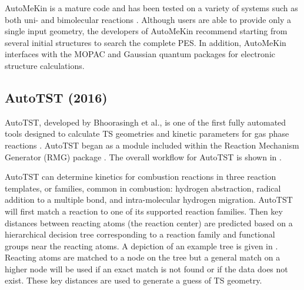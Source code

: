 \documentclass[preprint, 11pt]{elsarticle} %
\begin{document}
AutoMeKin is a mature code and has been tested on a variety of systems such as both uni- and bimolecular reactions \cite{Martinez:2015,Martinez:2015jccp,rodriguez:2018,Kopec:2019}.
Although users are able to provide only a single input geometry, the developers of AutoMeKin recommend starting from several initial structures to search the complete PES.
In addition, AutoMeKin interfaces with the MOPAC \cite{mopac:2016} and Gaussian \cite{Gaussian:2009} quantum packages for electronic structure calculations.

\subsection{AutoTST (2016)}

AutoTST, developed by Bhoorasingh et al., is one of the first fully automated tools designed to calculate TS geometries and kinetic parameters for gas phase reactions \cite{Bhoorasingh:2015,bhoorasingh:2017}.
AutoTST began as a module included within the Reaction Mechanism Generator (RMG) package \cite{gao:2016}. 
The overall workflow for AutoTST is shown in .

AutoTST can determine kinetics for combustion reactions in three reaction templates, or families, common in combustion: hydrogen abstraction, radical addition to a multiple bond, and intra-molecular hydrogen migration.
AutoTST will first match a reaction to one of its supported reaction families.
Then key distances between reacting atoms (the reaction center) are predicted based on a hierarchical decision tree corresponding to a reaction family and functional groups near the reacting atoms. 
A depiction of an example tree is given in .
Reacting atoms are matched to a node on the tree but a general match on a higher node will be used if an exact match is not found or if the data does not exist.
These key distances are used to generate a guess of TS geometry.
\end{document}
